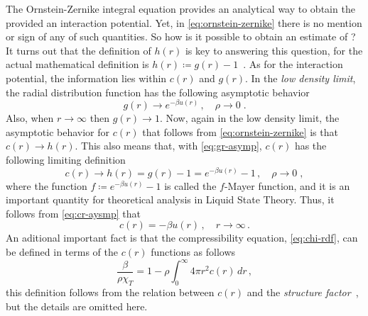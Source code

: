 The Ornstein-Zernike integral equation provides an analytical way to obtain the \rdf 
provided an interaction potential. Yet, in \autoref{eq:ornstein-zernike} there is no 
mention or sign of any of such quantities. So how is it possible to obtain an estimate
of \rdf? It turns out that the definition of $h(r)$ is key to answering this question,
for the actual mathematical definition is $h(r) \coloneqq g(r) - 1$~\cite{hansenTheorySimpleLiquids2013}.
As for the interaction potential, the information lies within $c(r)$ and $g(r)$.
In the \emph{low density limit}, the radial distribution function has the following
asymptotic behavior
\begin{equation}
    g(r) \to e^{- \beta u(r)} \, , \quad \rho \to 0 \; .
    \label{eq:gr-asymp}
\end{equation}
Also, when $r \to \infty$ then $g(r) \to 1$. 
Now, again in the low density limit, the asymptotic behavior
for $c(r)$ that follows from \autoref{eq:ornstein-zernike} is that $c(r) \to h(r)$.
This also means that, with \autoref{eq:gr-asymp}, $c(r)$ has the following
limiting definition
\begin{equation}
    c(r) \to h(r) = g(r) - 1 = e^{- \beta u(r)} - 1 \, , \quad \rho \to 0
    \; ,
    \label{eq:cr-aysmp}
\end{equation}
where the function $f \coloneqq e^{- \beta u(r)} - 1$ is called the $f$-Mayer
function, and it is an important quantity for theoretical analysis in Liquid State
Theory. Thus, it follows from \autoref{eq:cr-aysmp} that
\begin{equation}
    c(r) = - \beta u(r) \, , \quad r \to \infty 
    \, .
    \label{eq:cr-r-asymp}
\end{equation}
An aditional important fact is that the compressibility equation, \autoref{eq:chi-rdf},
can be defined in terms of the $c(r)$ functions as follows
\begin{equation}
    \frac{\beta}{\rho \chi_{T}} = 1 - \rho \int_{0}^{\infty} 4 \pi r^2 c(r) \, dr
    \, ,
    \label{eq:compressibility-cr}
\end{equation}
this definition follows from the relation between $c(r)$ and the
\emph{structure factor}~\cite{hansenTheorySimpleLiquids2013}, but the details are omitted 
here.

